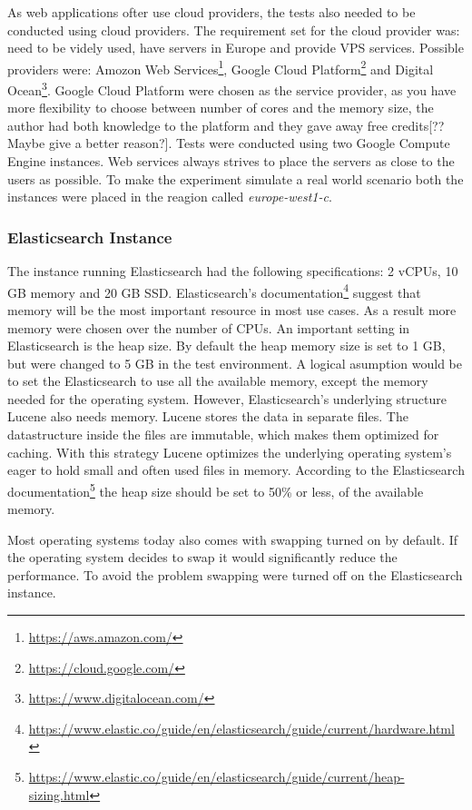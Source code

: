 As web applications ofter use cloud providers, the tests also needed to be conducted using cloud providers.
The requirement set for the cloud provider was: need to be videly used, have servers in Europe and provide VPS services.
Possible providers were: Amozon Web Services\footnote{\url{https://aws.amazon.com/}},
Google Cloud Platform\footnote{\url{https://cloud.google.com/}} and Digital Ocean\footnote{\url{https://www.digitalocean.com/}}.
Google Cloud Platform were chosen as the service provider, as you have more flexibility to choose between number of cores and the memory size,
the author had both knowledge to the platform and they gave away free credits[?? Maybe give a better reason?].
Tests were conducted using two Google Compute Engine instances.
Web services always strives to place the servers as close to the users as possible.
To make the experiment simulate a real world scenario both the instances were placed in the reagion called \textit{europe-west1-c}.

\subsubsection{Elasticsearch Instance}
The instance running Elasticsearch had the following specifications: 2 vCPUs, 10 GB memory and 20 GB SSD.
Elasticsearch's documentation\footnote{\url{https://www.elastic.co/guide/en/elasticsearch/guide/current/hardware.html}}
suggest that memory will be the most important resource in most use cases.
As a result more memory were chosen over the number of CPUs.
An important setting in Elasticsearch is the heap size.
By default the heap memory size is set to 1 GB, but were changed to 5 GB in the test environment.
A logical asumption would be to set the Elasticsearch to use all the available memory, except the memory needed for the operating system.
However, Elasticsearch's underlying structure Lucene also needs memory.
Lucene stores the data in separate files.
The datastructure inside the files are immutable, which makes them optimized for caching.
With this strategy Lucene optimizes the underlying operating system's eager to hold small and often used files in memory.
According to the Elasticsearch documentation\footnote{\url{https://www.elastic.co/guide/en/elasticsearch/guide/current/heap-sizing.html}}
the heap size should be set to 50\% or less, of the available memory.

Most operating systems today also comes with swapping turned on by default.
If the operating system decides to swap it would significantly reduce the performance.
To avoid the problem swapping were turned off on the Elasticsearch instance.

